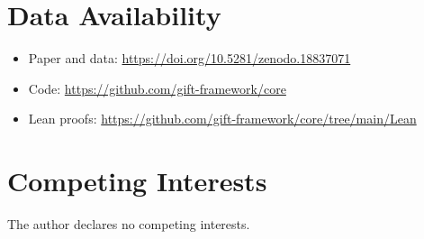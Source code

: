 \documentclass[11pt,a4paper]{article}
\begin{document}
\section*{Data Availability}

\begin{itemize}
\item Paper and data: \url{https://doi.org/10.5281/zenodo.18837071}
\item Code: \url{https://github.com/gift-framework/core}
\item Lean proofs: \url{https://github.com/gift-framework/core/tree/main/Lean}
\end{itemize}

\section*{Competing Interests}

The author declares no competing interests.

\newpage
\end{document}
